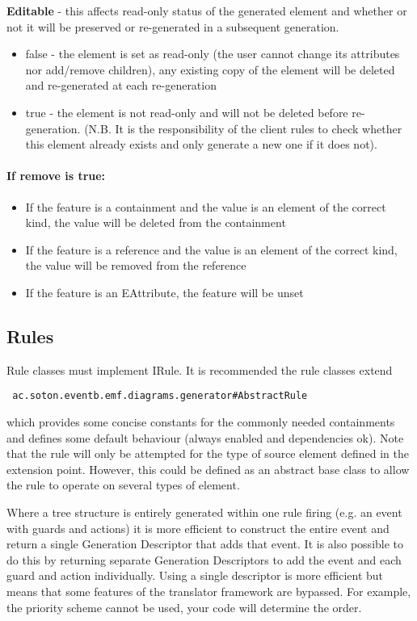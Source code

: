\textbf{Editable} - this affects read-only status of the generated element and whether or not it will be preserved or re-generated in a subsequent generation.
\begin{itemize}
	\item  false - the element is set as read-only (the user cannot change its attributes nor add/remove children), any existing copy of the element will be deleted and re-generated at each re-generation
	\item  true  - the element is not read-only and will not be deleted before re-generation. (N.B. It is the responsibility of the client rules to check whether this element already exists and only generate a new one if it does not).
\end{itemize}

\paragraph{If remove is true:}
\begin{itemize}
	\item If the feature is a containment and the value is an element of the correct kind, the value will be deleted from the containment
	\item If the feature is a reference and the value is an element of the correct kind, the value will be removed from the reference
	\item If the feature is an EAttribute, the feature will be unset 
\end{itemize}

\subsection{Rules}
\label{sec:rules}

Rule classes must implement IRule. It is recommended the rule classes extend
 \begin{verbatim}
 ac.soton.eventb.emf.diagrams.generator#AbstractRule
 \end{verbatim}
 which provides some concise constants for the commonly needed containments and defines some default behaviour (always enabled and dependencies ok).  Note that the rule will only be attempted for the type of source element defined in the extension point. However, this could be defined as an abstract base class to allow the rule to operate on several types of element.

Where a tree structure is entirely generated within one rule firing (e.g. an event with guards and actions) it is more efficient to construct the entire event and return a single Generation Descriptor that adds that event. It is also possible to do this by returning separate Generation Descriptors to add the event and each guard and action individually. Using a single descriptor is more efficient but means that some features of the translator framework are bypassed. For example, the priority scheme cannot be used, your code will determine the order. 

